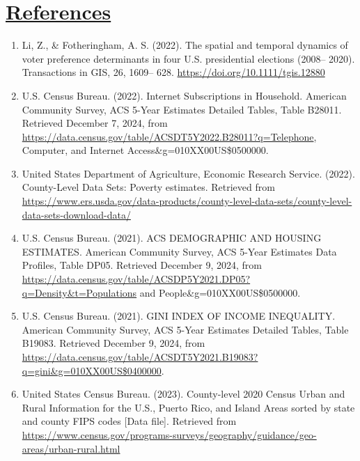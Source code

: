 \documentclass[
]{article}
\begin{document}
\newpage

\section{\texorpdfstring{\ul{References}}{References}}\label{references}

\begin{enumerate}
\def\labelenumi{\arabic{enumi}.}
\item
  Li, Z., \& Fotheringham, A. S. (2022). The spatial and temporal
  dynamics of voter preference determinants in four U.S. presidential
  elections (2008-- 2020). Transactions in GIS, 26, 1609-- 628.
  \url{https://doi.org/10.1111/tgis.12880}
\item
  U.S. Census Bureau. (2022). Internet Subscriptions in Household.
  American Community Survey, ACS 5-Year Estimates Detailed Tables, Table
  B28011. Retrieved December 7, 2024, from
  \url{https://data.census.gov/table/ACSDT5Y2022.B28011?q=Telephone},
  Computer, and Internet Access\&g=010XX00US\$0500000.
\item
  United States Department of Agriculture, Economic Research Service.
  (2022). County-Level Data Sets: Poverty estimates. Retrieved from
  \url{https://www.ers.usda.gov/data-products/county-level-data-sets/county-level-data-sets-download-data/}
\item
  U.S. Census Bureau. (2021). ACS DEMOGRAPHIC AND HOUSING ESTIMATES.
  American Community Survey, ACS 5-Year Estimates Data Profiles, Table
  DP05. Retrieved December 9, 2024, from
  \url{https://data.census.gov/table/ACSDP5Y2021.DP05?q=Density&t=Populations}
  and People\&g=010XX00US\$0500000.
\item
  U.S. Census Bureau. (2021). GINI INDEX OF INCOME INEQUALITY. American
  Community Survey, ACS 5-Year Estimates Detailed Tables, Table B19083.
  Retrieved December 9, 2024, from
  \url{https://data.census.gov/table/ACSDT5Y2021.B19083?q=gini&g=010XX00US$0400000}.
\item
  United States Census Bureau. (2023). County-level 2020 Census Urban
  and Rural Information for the U.S., Puerto Rico, and Island Areas
  sorted by state and county FIPS codes {[}Data file{]}. Retrieved from
  \url{https://www.census.gov/programs-surveys/geography/guidance/geo-areas/urban-rural.html}
\end{enumerate}
\end{document}
